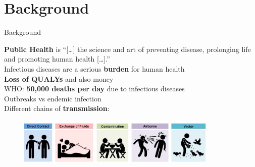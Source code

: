 \documentclass[table]{beamer}\usepackage[]{graphicx}\usepackage[]{color}
\begin{document}
\section{Background}
\begin{frame}[fragile]{Background}

\textbf{Public Health} is ``[\ldots] the science and art of preventing disease, prolonging life and promoting human health [\ldots].'' \\  %
\vspace{0.3cm}
Infectious diseases are a serious \textbf{burden} for human health \\
\vspace{0.3cm}
\textbf{Loss of QUALYs} and also money \\ %
\vspace{0.3cm}
WHO: \textbf{50,000 deaths per day} due to infectious diseases \\ %
\vspace{0.3cm}
Outbreaks vs endemic infection \\ %
\vspace{0.3cm}
Different chains of \textbf{transmission}:
\begin{figure}
  \flushleft
  \includegraphics[width=0.85\textwidth,keepaspectratio]{disease-transmission_med.jpeg}
\end{figure}

\end{frame}
\end{document}
